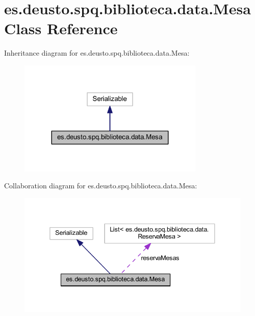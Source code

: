 \hypertarget{classes_1_1deusto_1_1spq_1_1biblioteca_1_1data_1_1_mesa}{}\section{es.\+deusto.\+spq.\+biblioteca.\+data.\+Mesa Class Reference}
\label{classes_1_1deusto_1_1spq_1_1biblioteca_1_1data_1_1_mesa}


Inheritance diagram for es.\+deusto.\+spq.\+biblioteca.\+data.\+Mesa\+:
\nopagebreak
\begin{figure}[H]
\begin{center}
\leavevmode
\includegraphics[width=251pt]{classes_1_1deusto_1_1spq_1_1biblioteca_1_1data_1_1_mesa__inherit__graph}
\end{center}
\end{figure}


Collaboration diagram for es.\+deusto.\+spq.\+biblioteca.\+data.\+Mesa\+:
\nopagebreak
\begin{figure}[H]
\begin{center}
\leavevmode
\includegraphics[width=338pt]{classes_1_1deusto_1_1spq_1_1biblioteca_1_1data_1_1_mesa__coll__graph}
\end{center}
\end{figure}
